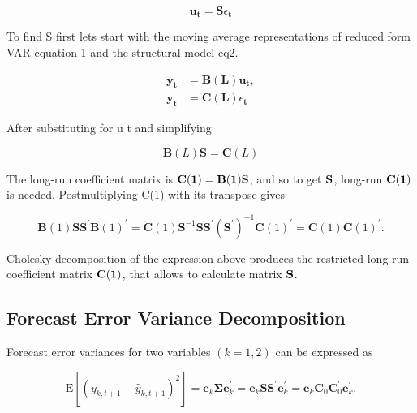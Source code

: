 \documentclass[a4paper,12pt]{article}
\begin{document}
\begin{equation}
		\mathbf{u}_{\mathbf{t}}=\mathbf{S} \epsilon_{\mathbf{t}}
\end{equation}

To find S first lets start with the moving average representations of reduced form VAR equation 1 and the structural model eq2.

\begin{equation}
\begin{split}
		\mathbf{y}_{\mathbf{t}} &=\mathbf{B}(\mathbf{L}) \mathbf{u}_{\mathbf{t}}, \\
		\mathbf{y}_{\mathbf{t}} &=\mathbf{C}(\mathbf{L}) \epsilon_{\mathbf{t}}
\end{split}
\end{equation}

After substituting for u t and simplifying

\begin{equation}
		\mathbf{B}(L) \mathbf{S}=\mathbf{C}(L)
\end{equation}

The long-run coefficient matrix is \(\bf C(1) = B(1)S\), and so to get \(\bf S\), long-run \(\bf C(1)\) is needed. Postmultiplying C(1) with its transpose gives

\begin{equation}
		\mathbf{B}(1) \mathbf{S S}^{\prime} \mathbf{B}(1)^{\prime}=\mathbf{C}(1) \mathbf{S}^{-1} \mathbf{S} \mathbf{S}^{\prime}\left(\mathbf{S}^{\prime}\right)^{-1} \mathbf{C}(1)^{\prime}=\mathbf{C}(1) \mathbf{C}(1)^{\prime}.
\end{equation}

Cholesky decomposition of the expression above produces the restricted long-run coefficient matrix \(\bf C(1)\), that allows to calculate matrix \(\bf S\).

\subsection{Forecast Error Variance Decomposition}

Forecast error variances for two variables \((k=1,2)\) can be expressed as

\begin{equation}
		\mathrm{E}\left[\left(y_{k, t+1}-\hat{y}_{k, t+1}\right)^{2}\right]=\mathbf{e}_{k} \mathbf{\Sigma} \mathbf{e}_{k}^{\prime}=\mathbf{e}_{k} \mathbf{S S}^{\prime} \mathbf{e}_{k}^{\prime}=\mathbf{e}_{k} \mathbf{C}_{0} \mathbf{C}_{0}^{\prime} \mathbf{e}_{k}^{\prime}.
\end{equation}
\end{document}
